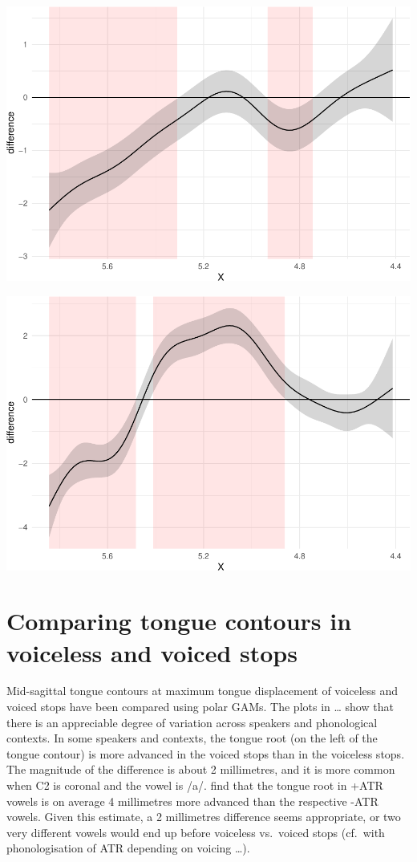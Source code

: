 \documentclass[12pt,]{article}
\begin{document}
\includegraphics{2018-polar-gam_files/figure-latex/diff-it01-a-1.pdf}

\includegraphics{2018-polar-gam_files/figure-latex/diff-it01-u-1.pdf}

\hypertarget{comparing-tongue-contours-in-voiceless-and-voiced-stops}{%
\section{Comparing tongue contours in voiceless and voiced
stops}\label{comparing-tongue-contours-in-voiceless-and-voiced-stops}}

Mid-sagittal tongue contours at maximum tongue displacement of voiceless
and voiced stops have been compared using polar GAMs. The plots in
\ldots{} show that there is an appreciable degree of variation across
speakers and phonological contexts. In some speakers and contexts, the
tongue root (on the left of the tongue contour) is more advanced in the
voiced stops than in the voiceless stops. The magnitude of the
difference is about 2 millimetres, and it is more common when C2 is
coronal and the vowel is /a/. \citet{kirkham2017} find that the tongue
root in +ATR vowels is on average 4 millimetres more advanced than the
respective -ATR vowels. Given this estimate, a 2 millimetres difference
seems appropriate, or two very different vowels would end up before
voiceless vs.~voiced stops (cf.~with phonologisation of ATR depending on
voicing \ldots{}).
\end{document}
